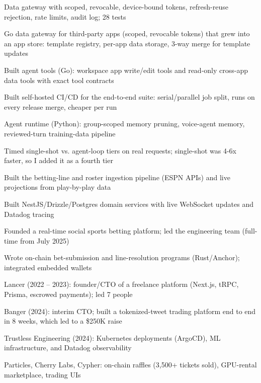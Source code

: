 \documentclass[print]{jack-resume}
\begin{document}
\begin{tightemize}
    \item Data gateway with scoped, revocable, device-bound tokens, refresh-reuse rejection, rate limits, audit log; 28 tests
    \item Go data gateway for third-party apps (scoped, revocable tokens) that grew into an app store: template registry, per-app data storage, 3-way merge for template updates
    \item Built agent tools (Go): workspace app write/edit tools and read-only cross-app data tools with exact tool contracts
    \item Built self-hosted CI/CD for the end-to-end suite: serial/parallel job split, runs on every release merge, cheaper per run
    \item Agent runtime (Python): group-scoped memory pruning, voice-agent memory, reviewed-turn training-data pipeline
    \item Timed single-shot vs. agent-loop tiers on real requests; single-shot was 4-6x faster, so I added it as a fourth tier
\end{tightemize}
\sectionsep

\begin{tightemize}
    \item Built the betting-line and roster ingestion pipeline (ESPN APIs) and live projections from play-by-play data
    \item Built NestJS/Drizzle/Postgres domain services with live WebSocket updates and Datadog tracing
    \item Founded a real-time social sports betting platform; led the engineering team (full-time from July 2025)
    \item Wrote on-chain bet-submission and line-resolution programs (Rust/Anchor); integrated embedded wallets
\end{tightemize}
\sectionsep

\begin{tightemize}
    \item Lancer (2022 – 2023): founder/CTO of a freelance platform (Next.js, tRPC, Prisma, escrowed payments); led 7 people
    \item Banger (2024): interim CTO; built a tokenized-tweet trading platform end to end in 8 weeks, which led to a \$250K raise
    \item Trustless Engineering (2024): Kubernetes deployments (ArgoCD), ML infrastructure, and Datadog observability
    \item Particles, Cherry Labs, Cypher: on-chain raffles (3,500+ tickets sold), GPU-rental marketplace, trading UIs
\end{tightemize}
\sectionsep
\end{document}
